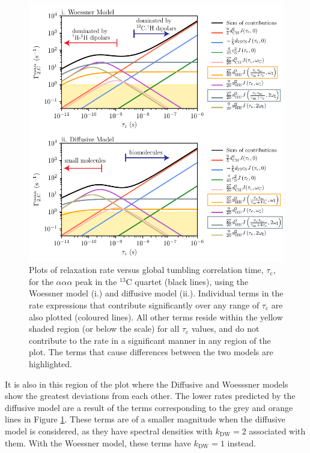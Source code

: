 \begin{figure}
\centering
\includegraphics[scale=1]{./Figures/SimonsFigs/Contributions.pdf}
\caption{Plots of relaxation rate versus global tumbling correlation time, $\tau_{\text{c}}$, for the $\alpha \alpha \alpha$ peak in the $^{13}$C quartet (black lines), using the Woessner model (i.) and diffusive model (ii.). Individual terms in the rate expressions that contribute significantly over any range of $\tau_{\text{c}}$ are also plotted (coloured lines). All other terms reside within the yellow shaded region (or below the scale) for all $\tau_{\text{c}}$ values, and do not contribute to the rate in a significant manner in any region of the plot. The terms that cause differences between the two models are highlighted.}
\label{IndividualTerms}
\end{figure}
It is also in this region of the plot where the Diffusive and Woesssner models show the greatest deviations from each other. The lower rates predicted by the diffusive model are a result of the terms corresponding to the grey and orange lines in Figure \ref{IndividualTerms}. These terms are of a smaller magnitude when the diffusive model is considered, as they have spectral densities with $k_{\text{DW}} = 2$ associated with them. With the Woessner model, these terms have $k_{\text{DW}} = 1$ instead.\\
